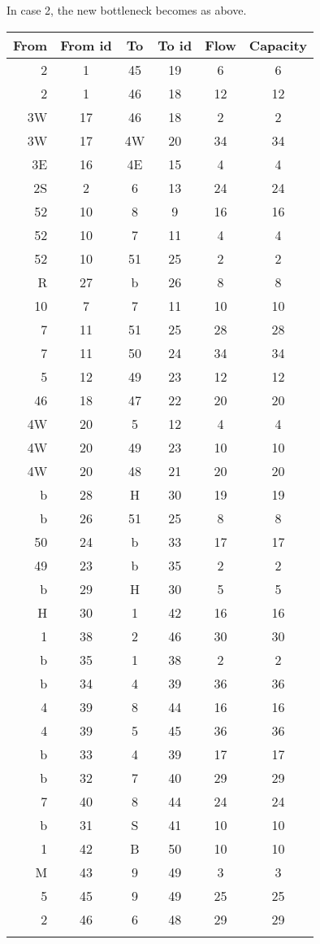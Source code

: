 \documentclass{tufte-handout}
\begin{document}
  In case 2, the new bottleneck becomes as above.

 \begin{tabular}{rccccc}\toprule
From&From id&To&To id&Flow&Capacity\\\midrule
2   &1      &45&19   &6   &6        \\
2   &1      &46&18   &12  &12       \\
3W  &17     &46&18   &2   &2        \\
3W  &17     &4W&20   &34  &34       \\
3E  &16     &4E&15   &4   &4        \\
2S  &2      &6 &13   &24  &24       \\
52  &10     &8 &9    &16  &16       \\
52  &10     &7 &11   &4   &4        \\
52  &10     &51&25   &2   &2        \\
R   &27     &b &26   &8   &8        \\
10  &7      &7 &11   &10  &10       \\
7   &11     &51&25   &28  &28       \\
7   &11     &50&24   &34  &34       \\
5   &12     &49&23   &12  &12       \\
46  &18     &47&22   &20  &20       \\
4W  &20     &5 &12   &4   &4        \\
4W  &20     &49&23   &10  &10       \\
4W  &20     &48&21   &20  &20       \\
b   &28     &H &30   &19  &19       \\
b   &26     &51&25   &8   &8        \\
50  &24     &b &33   &17  &17       \\
49  &23     &b &35   &2   &2        \\
b   &29     &H &30   &5   &5        \\
H   &30     &1 &42   &16  &16       \\
1   &38     &2 &46   &30  &30       \\
b   &35     &1 &38   &2   &2        \\
b   &34     &4 &39   &36  &36       \\
4   &39     &8 &44   &16  &16       \\
4   &39     &5 &45   &36  &36       \\
b   &33     &4 &39   &17  &17       \\
b   &32     &7 &40   &29  &29       \\
7   &40     &8 &44   &24  &24       \\
b   &31     &S &41   &10  &10       \\
1   &42     &B &50   &10  &10       \\
M   &43     &9 &49   &3   &3        \\
5   &45     &9 &49   &25  &25       \\
2   &46     &6 &48   &29  &29       \\
 \\\bottomrule
  \end{tabular}
  \bigskip
\end{document}
